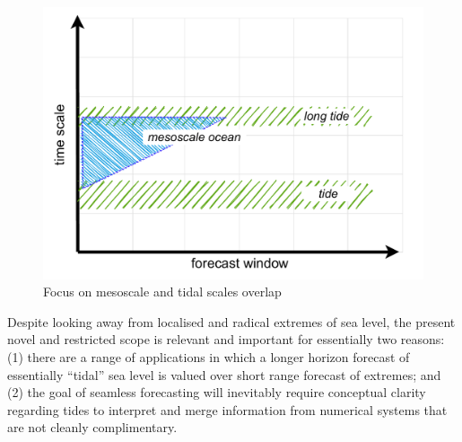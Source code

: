 \begin{figure}[!hbt]\centering
  \includegraphics[width=\figwidthBig]{figures/diagrams/scales_focus.pdf}
  \caption{Focus on mesoscale and tidal scales overlap}
  \label{fig:forecastScalesFocus}
\end{figure}

Despite looking away from localised and radical extremes of sea level, the present novel and restricted scope is relevant and important for essentially two  reasons: (1) there are a range of applications in which a longer horizon forecast of essentially ``tidal'' sea level is valued over short range forecast of extremes; and (2) the goal of seamless forecasting will inevitably require conceptual clarity regarding tides to interpret and merge information from numerical systems that are not cleanly complimentary. 

